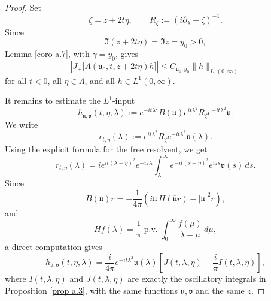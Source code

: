 \documentclass[10pt]{article}
\numberwithin{equation}{section}
\numberwithin{theorem}{section}
\begin{document}
\begin{proof}
Set
\[
\zeta=z+2t\eta,
\qquad
R_\zeta:=(i\partial_\lambda-\zeta)^{-1}.
\]
Since
\[
\Im(z+2t\eta)=\Im z=y_0>0,
\]
Lemma \ref{coro a.7}, with \(\gamma=y_0\), gives
\begin{equation}
\label{eq:smooth-compact-boundary-estimate}
\left|
J_+\bigl[A(\mathfrak u_0,t,z+2t\eta)h\bigr]
\right|
\le
C_{\mathfrak u_0,y_0}\|h\|_{L^1(0,\infty)}
\end{equation}
for all \(t<0\), all \(\eta\in\Lambda\), and all \(h\in L^1(0,\infty)\).

It remains to estimate the \(L^1\)-input
\[
h_{\mathfrak u,\mathfrak v}(t,\eta,\lambda)
:=
e^{-it\lambda^2}
B(\mathfrak u)e^{it\lambda^2}
R_\zeta e^{-it\lambda^2}\mathfrak v .
\]
We write
\[
r_{t,\eta}(\lambda)
:=
e^{it\lambda^2}
R_\zeta e^{-it\lambda^2}\mathfrak v(\lambda).
\]
Using the explicit formula for the free resolvent, we get
\begin{equation}
\label{eq:smooth-compact-r-formula}
r_{t,\eta}(\lambda)
=
i e^{it(\lambda-\eta)^2}e^{-iz\lambda}
\int_\lambda^\infty
e^{-it(s-\eta)^2}e^{izs}\mathfrak v(s)\,ds .
\end{equation}
Since
\[
B(\mathfrak u)r
=
-\frac1{4\pi}
\left(
i\mathfrak u\,H(\overline{\mathfrak u}r)
-
|\mathfrak u|^2r
\right),
\]
and
\[
Hf(\lambda)
=
\frac1\pi\operatorname{p.v.}
\int_0^\infty\frac{f(\mu)}{\lambda-\mu}\,d\mu ,
\]
a direct computation gives
\begin{equation}
\label{eq:smooth-compact-h-identity}
h_{\mathfrak u,\mathfrak v}(t,\eta,\lambda)
=
\frac{i}{4\pi}
e^{-it\lambda^2}\mathfrak u(\lambda)
\left[
J(t,\lambda,\eta)-\frac{i}{\pi}I(t,\lambda,\eta)
\right],
\end{equation}
where \(I(t,\lambda,\eta)\) and \(J(t,\lambda,\eta)\) are exactly the oscillatory
integrals in Proposition \ref{prop a.3}, with the same functions
\(\mathfrak u,\mathfrak v\) and the same \(z\).


\end{proof}
\end{document}
